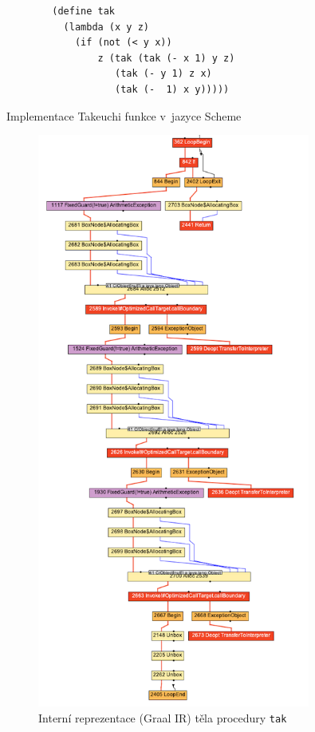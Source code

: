 \documentclass[
  master,
  biblatex,
  figures=true,
  theorems,
  sourcecodes,
  glossaries,
  index
]{kidiplom}
\begin{document}
\begin{listing} [h]
    \begin{verbatim}
        (define tak
          (lambda (x y z)
            (if (not (< y x))
                z (tak (tak (- x 1) y z)
                   (tak (- y 1) z x)
                   (tak (-  1) x y)))))
    \end{verbatim}
    \caption{Implementace Takeuchi funkce v~jazyce Scheme}
    \label{tak-impl}
\end{listing}




\begin{figure} [h]
    \centering
    \includegraphics[width= 0.8\textwidth, height=1.48\linewidth]{images/graalIR.png}
    \caption{Interní reprezentace (Graal IR) těla procedury \texttt{tak}}
    \label{fig:graal-ir}
\end{figure}
\end{document}
